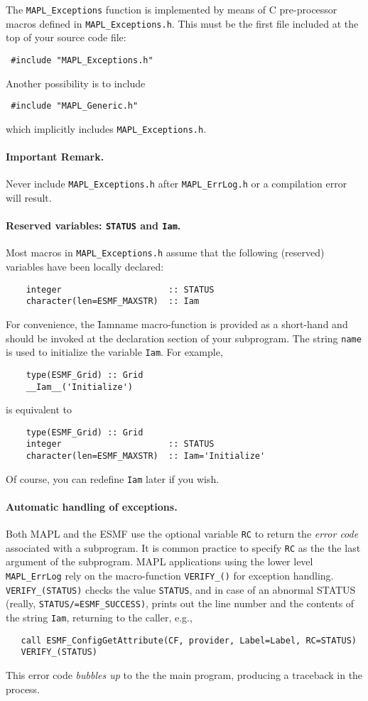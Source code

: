 The {\tt MAPL\_Exceptions} function is implemented by means of C
pre-processor macros defined in {\tt MAPL\_Exceptions.h}. This must be
the first file included at the top of your source code file:
\begin{verbatim}
 #include "MAPL_Exceptions.h"
\end{verbatim}
Another possibility is to include
\begin{verbatim}
 #include "MAPL_Generic.h"
\end{verbatim}
which implicitly includes {\tt MAPL\_Exceptions.h}. 

\paragraph{Important Remark.} Never include {\tt MAPL\_Exceptions.h}
after {\tt MAPL\_ErrLog.h} or a compilation error will result. 

\paragraph{Reserved variables: {\tt STATUS} and {\tt Iam}.} Most
macros in {\tt MAPL\_Exceptions.h} assume that the following
(reserved) variables have been locally declared:
\begin{verbatim}
    integer                     :: STATUS
    character(len=ESMF_MAXSTR)  :: Iam
\end{verbatim}
For convenience, the \f{Iam}{name} macro-function is provided as a
short-hand and should be invoked at the declaration section of your
subprogram. The string {\tt name} is used to initialize the variable
{\tt Iam}. For example,
\begin{verbatim}
    type(ESMF_Grid) :: Grid
    __Iam__('Initialize')
\end{verbatim}
is equivalent to
\begin{verbatim}
    type(ESMF_Grid) :: Grid
    integer                     :: STATUS
    character(len=ESMF_MAXSTR)  :: Iam='Initialize'
\end{verbatim}
Of course, you can redefine {\tt Iam} later if you wish.

\paragraph{Automatic handling of exceptions.}

Both MAPL and the ESMF use the optional variable {\tt RC} to return
the {\em error code} associated with a subprogram. It is common
practice to specify {\tt RC} as the the last argument of the subprogram. MAPL
applications using the lower level {\tt MAPL\_ErrLog} rely on the
macro-function {\tt VERIFY\_()} for exception handling. {\tt
  VERIFY\_(STATUS)} checks the value {\tt STATUS}, and in case of an
abnormal STATUS (really, {\tt STATUS/=ESMF\_SUCCESS)}, prints out the line
number and the contents of the string {\tt Iam}, returning to the caller, e.g.,
\begin{verbatim}
   call ESMF_ConfigGetAttribute(CF, provider, Label=Label, RC=STATUS)
   VERIFY_(STATUS)
\end{verbatim}
This error code {\em bubbles up} to the the main program, producing a
traceback in the process.

